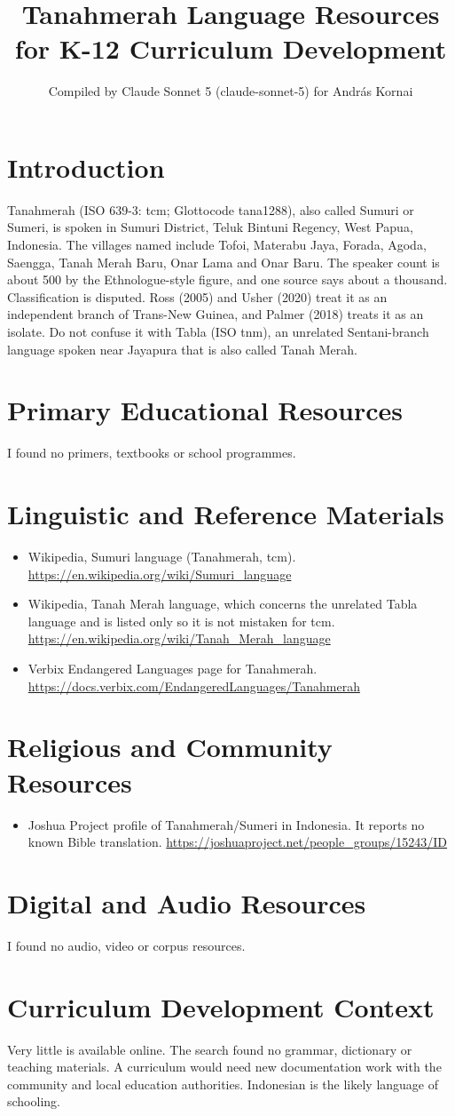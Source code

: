 \documentclass[12pt]{article}
\title{Tanahmerah Language Resources for K-12 Curriculum Development}
\author{Compiled by Claude Sonnet 5 (claude-sonnet-5) for Andr\'as Kornai}
\date{}
\begin{document}
\maketitle
\section{Introduction}
Tanahmerah (ISO 639-3: tcm; Glottocode tana1288), also called Sumuri or Sumeri, is spoken in Sumuri District, Teluk Bintuni Regency, West Papua, Indonesia. The villages named include Tofoi, Materabu Jaya, Forada, Agoda, Saengga, Tanah Merah Baru, Onar Lama and Onar Baru. The speaker count is about 500 by the Ethnologue-style figure, and one source says about a thousand. Classification is disputed. Ross (2005) and Usher (2020) treat it as an independent branch of Trans-New Guinea, and Palmer (2018) treats it as an isolate. Do not confuse it with Tabla (ISO tnm), an unrelated Sentani-branch language spoken near Jayapura that is also called Tanah Merah.
\section{Primary Educational Resources}
I found no primers, textbooks or school programmes.
\section{Linguistic and Reference Materials}
\begin{itemize}
\item Wikipedia, Sumuri language (Tanahmerah, tcm). \url{https://en.wikipedia.org/wiki/Sumuri_language}
\item Wikipedia, Tanah Merah language, which concerns the unrelated Tabla language and is listed only so it is not mistaken for tcm. \url{https://en.wikipedia.org/wiki/Tanah_Merah_language}
\item Verbix Endangered Languages page for Tanahmerah. \url{https://docs.verbix.com/EndangeredLanguages/Tanahmerah}
\end{itemize}
\section{Religious and Community Resources}
\begin{itemize}
\item Joshua Project profile of Tanahmerah/Sumeri in Indonesia. It reports no known Bible translation. \url{https://joshuaproject.net/people_groups/15243/ID}
\end{itemize}
\section{Digital and Audio Resources}
I found no audio, video or corpus resources.
\section{Curriculum Development Context}
Very little is available online. The search found no grammar, dictionary or teaching materials. A curriculum would need new documentation work with the community and local education authorities. Indonesian is the likely language of schooling.
\end{document}
